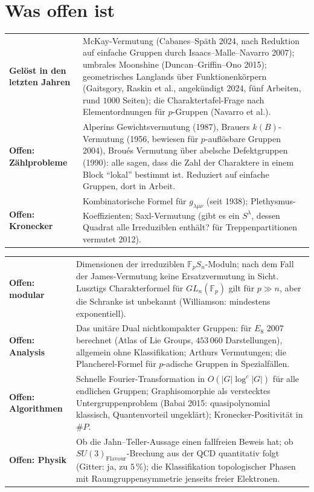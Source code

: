 \section{Was offen ist}

\begin{merksatz}
\begin{center}
{\small
\renewcommand{\arraystretch}{1.45}
\begin{tabular}{@{}P{3.2cm}P{5.4cm}@{}}
\toprule
\textbf{Gelöst in den letzten Jahren} & McKay-Vermutung (Cabanes--Späth 2024, nach Reduktion auf einfache Gruppen durch Isaacs--Malle--Navarro 2007); umbrales Moonshine (Duncan--Griffin--Ono 2015); geometrisches Langlands über Funktionenkörpern (Gaitsgory, Raskin et al., angekündigt 2024, fünf Arbeiten, rund $1000$ Seiten); die Charaktertafel-Frage nach Elementordnungen für $p$-Gruppen (Navarro et al.).\\
\textbf{Offen: Zählprobleme} & Alperins Gewichtsvermutung (1987), Brauers $k(B)$-Vermutung (1956, bewiesen für $p$-auflösbare Gruppen 2004), Broués Vermutung über abelsche Defektgruppen (1990): alle sagen, dass die Zahl der Charaktere in einem Block \enquote{lokal} bestimmt ist. Reduziert auf einfache Gruppen, dort in Arbeit.\\
\textbf{Offen: Kronecker} & Kombinatorische Formel für $g_{\lambda\mu\nu}$ (seit 1938); Plethysmus-Koeffizienten; Saxl-Vermutung (gibt es ein $S^{\lambda}$, dessen Quadrat alle Irreduziblen enthält? für Treppenpartitionen vermutet 2012).\\
\bottomrule
\end{tabular}}
\end{center}
\begin{center}
{\small
\renewcommand{\arraystretch}{1.45}
\begin{tabular}{@{}P{3.2cm}P{5.4cm}@{}}
\toprule
\textbf{Offen: modular} & Dimensionen der irreduziblen $\mathbb F_p S_n$-Moduln; nach dem Fall der James-Vermutung keine Ersatzvermutung in Sicht. Lusztigs Charakterformel für $GL_n(\mathbb F_p)$ gilt für $p\gg n$, aber die Schranke ist unbekannt (Williamson: mindestens exponentiell).\\
\textbf{Offen: Analysis} & Das unitäre Dual nichtkompakter Gruppen: für $E_8$ 2007 berechnet (Atlas of Lie Groups, $453\,060$ Darstellungen), allgemein ohne Klassifikation; Arthurs Vermutungen; die Plancherel-Formel für $p$-adische Gruppen in Spezialfällen.\\
\textbf{Offen: Algorithmen} & Schnelle Fourier-Transformation in $O(|G|\log^{c}|G|)$ für alle endlichen Gruppen; Graphisomorphie als verstecktes Untergruppenproblem (Babai 2015: quasipolynomial klassisch, Quantenvorteil ungeklärt); Kronecker-Positivität in $\#P$.\\
\textbf{Offen: Physik} & Ob die Jahn--Teller-Aussage einen fallfreien Beweis hat; ob $SU(3)_{\mathrm{Flavour}}$-Brechung aus der QCD quantitativ folgt (Gitter: ja, zu $5\,\%$); die Klassifikation topologischer Phasen mit Raumgruppensymmetrie jenseits freier Elektronen.\\
\bottomrule
\end{tabular}}
\end{center}


\end{merksatz}
